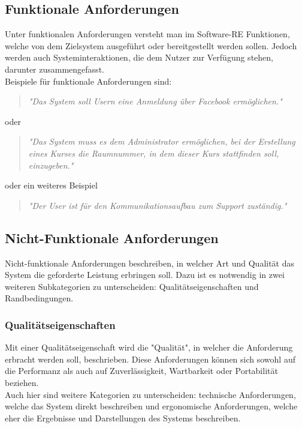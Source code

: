 \subsection{Funktionale Anforderungen}
\label{subsec:funktionaleanforderungen}
Unter funktionalen Anforderungen versteht man im Software-\ac{RE} Funktionen, welche von dem Zielsystem ausgeführt oder bereitgestellt werden sollen. Jedoch werden auch Systeminteraktionen, die dem Nutzer zur Verfügung stehen, darunter zusammengefasst.\\

Beispiele für funktionale Anforderungen sind:

\begin{quote}
\textit{"Das System soll Usern eine Anmeldung über Facebook ermöglichen."}
\end{quote}
oder 
\begin{quote}
\textit{"Das System muss es dem Administrator ermöglichen, bei der Erstellung eines Kurses die Raumnummer, in dem dieser Kurs stattfinden soll, einzugeben."}
\end{quote}
oder ein weiteres Beispiel
\begin{quote}
\textit{"Der User ist für den Kommunikationsaufbau zum Support zuständig."}
\end{quote}

\subsection{Nicht-Funktionale Anforderungen}
Nicht-funktionale Anforderungen beschreiben, in welcher Art und Qualität das System die geforderte Leistung erbringen soll. Dazu ist es notwendig in zwei weiteren Subkategorien zu unterscheiden: Qualitätseigenschaften und Randbedingungen. 

\subsubsection{Qualitätseigenschaften}
\label{subsubsec:qualitätseigenschaften}
Mit einer Qualitätseigenschaft wird die "Qualität", in welcher die Anforderung erbracht werden soll, beschrieben. Diese Anforderungen können sich sowohl auf die Performanz als auch auf  Zuverlässigkeit, Wartbarkeit oder Portabilität beziehen.\\

Auch hier sind weitere Kategorien zu unterscheiden: technische Anforderungen, welche das System direkt beschreiben und ergonomische Anforderungen, welche eher die Ergebnisse und Darstellungen des Systems beschreiben. 

